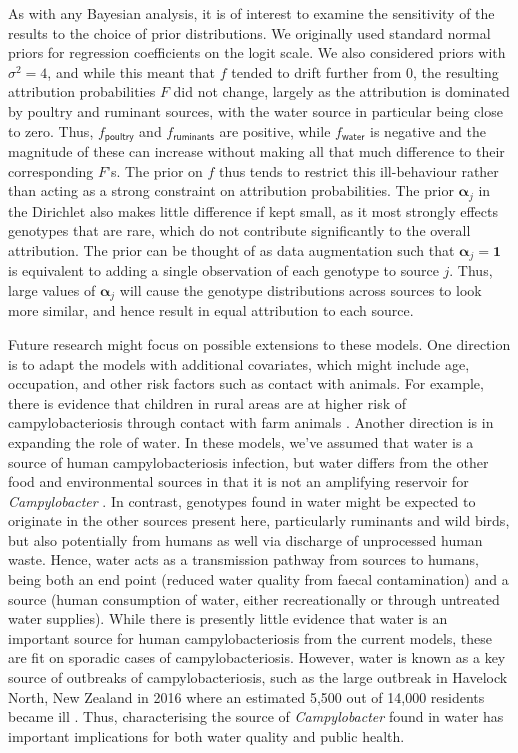 \documentclass[AMA,STIX1COL]{WileyNJD-v2}
\begin{document}
As with any Bayesian analysis, it is of interest to examine the sensitivity of the results to the choice of prior distributions. We originally used standard normal priors for regression coefficients on the logit scale. We also considered priors with $\sigma^2=4$, and while this meant that $f$ tended to drift further from 0, the resulting attribution probabilities $F$ did not change, largely as the attribution is dominated by poultry and ruminant sources, with the water source in particular being close to zero. Thus, $f_\mathsf{poultry}$ and $f_\mathsf{ruminants}$ are positive, while $f_\mathsf{water}$ is negative and the magnitude of these can increase without making all that much difference to their corresponding $F$'s. The prior on $f$ thus tends to restrict this ill-behaviour rather than acting as a strong constraint on attribution probabilities. The prior $\mathbf{\alpha}_j$ in the Dirichlet also makes little difference if kept small, as it most strongly effects genotypes that are rare, which do not contribute significantly to the overall attribution. The prior can be thought of as data augmentation such that $\mathbf{\alpha}_j=\mathbf{1}$ is equivalent to adding a single observation of each genotype to source $j$. Thus, large values of $\mathbf{\alpha}_j$ will cause the genotype distributions across sources to look more similar, and hence result in equal attribution to each source.

Future research might focus on possible extensions to these models. One direction is to adapt the models with additional covariates, which might include age, occupation, and other risk factors such as contact with animals. For example, there is evidence that children in rural areas are at higher risk of campylobacteriosis through contact with farm animals \cite{MullM, Spencer2012}. Another direction is in expanding the role of water. In these models, we've assumed that water is a source of human campylobacteriosis infection, but water differs from the other food and environmental sources in that it is not an amplifying reservoir for \emph{Campylobacter} \cite{Wagen}. In contrast, genotypes found in water might be expected to originate in the other sources present here, particularly ruminants and wild birds, but also potentially from humans as well via discharge of unprocessed human waste. Hence, water acts as a transmission pathway from sources to humans, being both an end point (reduced water quality from faecal contamination) and a source (human consumption of water, either recreationally or through untreated water supplies). While there is presently little evidence that water is an important source for human campylobacteriosis from the current models, these are fit on sporadic cases of campylobacteriosis. However, water is known as a key source of outbreaks of campylobacteriosis, such as the large outbreak in Havelock North, New Zealand in 2016 where an estimated 5,500 out of 14,000 residents became ill \cite{dia_campy_report1}. Thus, characterising the source of \emph{Campylobacter} found in water has important implications for both water quality and public health.
\end{document}
